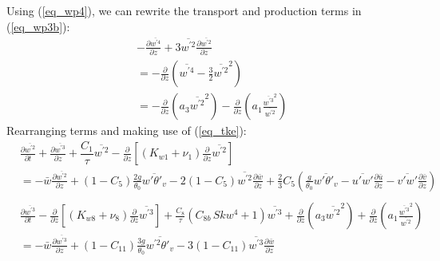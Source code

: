 \documentclass[11pt,fleqn]{article}
\newcommand{\ptlder}[2]{\frac{\partial #1}{\partial #2}}
\begin{document}
%
Using (\ref{eq_wp4}), we can rewrite the transport and production terms
in (\ref{eq_wp3b}):
%
\begin{equation}
\begin{split}
& - \ptlder{\overline{w^{'4}}}{z} 
  + 3\overline{w^{'2}}\ptlder{\overline{w^{'2}}}{z} \\
& = - \ptlder{}{z}
         \left( \overline{w^{'4}} -\frac{3}{2}\overline{w^{'2}}^2 \right) \\
& = - \ptlder{}{z} 
      \left( a_3 \overline{w^{'2}}^2 \right)
    - \ptlder{}{z} 
      \left( a_1 \frac{ \overline{w^{'3}}^2 }{ \overline{w^{'2}} } \right)
\end{split}
\end{equation}
%
Rearranging terms and making use of (\ref{eq_tke}):
%
\begin{equation}
\label{eq_wp2c}
\begin{split}
& \ptlder{\overline{w^{'2}}}{t} 
  + \ptlder{\overline{w^{'3}}}{z} 
  + \dfrac{C_1}{\tau} \overline{w^{'2}} 
  - \ptlder{}{z} \left[ \left( K_{w1} + \nu_1 \right)
                        \ptlder{}{z} \overline{w^{'2}} 
                 \right]  \\
& =
  - \bar{w}\ptlder{\overline{w^{'2}}}{z}	 
  + ( 1 - C_5 ) \frac{2g}{\theta_0} \overline{w'\theta'_v}
  - 2 ( 1 - C_5 ) \overline{w^{'2}}\ptlder{\bar{w}}{z}
  + \frac{2}{3} C_5
     \left(
       \frac{g}{\theta_0} \overline{w'\theta'_v} 
       - \overline{u'w'}\ptlder{\bar{u}}{z} 
       - \overline{v'w'}\ptlder{\bar{v}}{z} 
     \right) \\
\end{split}
\end{equation}
%
\begin{equation}
\label{eq_wp3c}
\begin{split}
& \ptlder{\overline{w^{'3}}}{t}
   - \ptlder{}{z} \left[ \left( K_{w8} + \nu_8 \right)
                         \ptlder{}{z} \overline{w^{'3}} 
                  \right]
  + \frac{C_8}{\tau}\left( C_{8b} \, Skw^4 + 1 \right) \overline{w^{'3}}
  + \ptlder{}{z} \left( a_3 \overline{w^{'2}}^2 \right)
  + \ptlder{}{z} 
       \left(
          a_1 \frac{ \overline{w^{'3}}^2 }{ \overline{w^{'2}} }
       \right) \\
& = 
  - \bar{w}\ptlder{\overline{w^{'3}}}{z}
  + (1 - C_{11}) \frac{3g}{\theta_0} \overline{w^{'2}\theta'_v}
  - 3 ( 1 - C_{11} ) \overline{w^{'3}}\ptlder{\bar{w}}{z} \\
\end{split}
\end{equation}
%
\end{document}
